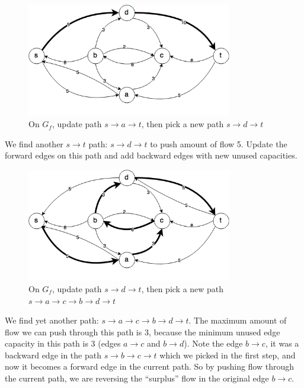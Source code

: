 \documentclass{article}
\begin{document}
\begin{figure}[H]
\centering
\includegraphics[width=0.8\textwidth]{gf_2.png}
\caption{On $G_f$, update path $s \rightarrow a \rightarrow t$, then pick a new path
$s \rightarrow d \rightarrow t$}
\end{figure}

We find another $s \rightarrow t$ path: $s \rightarrow d \rightarrow t$
to push amount of flow 5.
Update the forward edges on this path and add backward edges with new
unused capacities.

\begin{figure}[H]
\centering
\includegraphics[width=0.8\textwidth]{gf_3.png}
\caption{On $G_f$, update path $s \rightarrow d \rightarrow t$, 
then pick a new path $s \rightarrow a \rightarrow c \rightarrow b
\rightarrow d \rightarrow t$}
\end{figure}

We find yet another path: $s \rightarrow a \rightarrow c \rightarrow b
\rightarrow d \rightarrow t$. The maximum amount of flow we can push
through this path is 3, because the minimum unused edge capacity in this 
path is 3 (edges $a \rightarrow c$ and $b \rightarrow d$).
Note the edge $b \rightarrow c$, it was a backward edge in the path
$s \rightarrow b \rightarrow c \rightarrow t$ which we picked in the first
step, and now it becomes a forward edge in the current path.
So by pushing flow through the current path, we are reversing the 
``surplus'' flow in the original edge $b \rightarrow c$.
\end{document}
